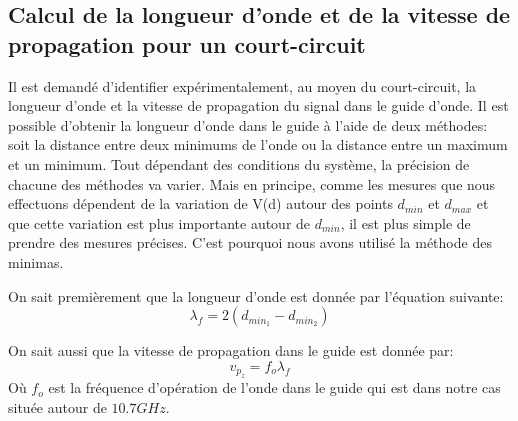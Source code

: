 \subsection{Calcul de la longueur d'onde et de la vitesse de propagation pour un court-circuit}
Il est demandé d'identifier expérimentalement, au moyen du court-circuit, la longueur d'onde et la vitesse de propagation du signal dans le guide d'onde. Il est possible d'obtenir la longueur d'onde dans le guide à l'aide de deux méthodes: soit la distance entre deux minimums de l'onde ou la distance entre un maximum et un minimum. Tout dépendant des conditions du système, la précision de chacune des méthodes va varier. Mais en principe, comme les mesures que nous effectuons dépendent de la variation de V(d) autour des points $d_{min}$ et $d_{max}$ et que cette variation est plus importante autour de $d_{min}$, il est plus simple de prendre des mesures précises. C'est pourquoi nous avons utilisé la méthode des minimas.

On sait premièrement que la longueur d'onde est donnée par l'équation suivante:
\begin{equation}
    \label{eq:10}
    \lambda_f = 2(d_{min_1} - d_{min_2})
\end{equation}

On sait aussi que la vitesse de propagation dans le guide est donnée par:
\begin{equation}
\label{eq:eq1}
    v_{p_z} = f_o\lambda_f
\end{equation}
Où $f_o$ est la fréquence d'opération de l'onde dans le guide qui est dans notre cas située autour de $10.7 GHz$.


